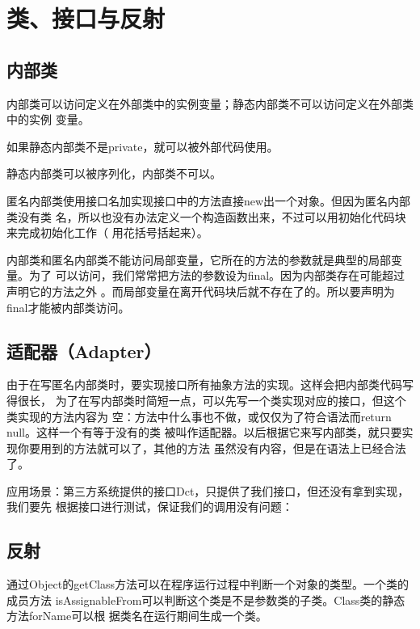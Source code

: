 \chapter{类、接口与反射}


\section{内部类}

内部类可以访问定义在外部类中的实例变量；静态内部类不可以访问定义在外部类中的实例
变量。

如果静态内部类不是private，就可以被外部代码使用。

静态内部类可以被序列化，内部类不可以。

匿名内部类使用接口名加实现接口中的方法直接new出一个对象。但因为匿名内部类没有类
名，所以也没有办法定义一个构造函数出来，不过可以用初始化代码块来完成初始化工作（
用花括号括起来）。

内部类和匿名内部类不能访问局部变量，它所在的方法的参数就是典型的局部变量。为了
可以访问，我们常常把方法的参数设为final。因为内部类存在可能超过声明它的方法之外
。而局部变量在离开代码块后就不存在了的。所以要声明为final才能被内部类访问。


\section{适配器（Adapter）}

由于在写匿名内部类时，要实现接口所有抽象方法的实现。这样会把内部类代码写得很长，
为了在写内部类时简短一点，可以先写一个类实现对应的接口，但这个类实现的方法内容为
空：方法中什么事也不做，或仅仅为了符合语法而return null。这样一个有等于没有的类
被叫作适配器。以后根据它来写内部类，就只要实现你要用到的方法就可以了，其他的方法
虽然没有内容，但是在语法上已经合法了。

应用场景：第三方系统提供的接口Dct，只提供了我们接口，但还没有拿到实现，我们要先
根据接口进行测试，保证我们的调用没有问题：









\section{反射}

通过Object的getClass方法可以在程序运行过程中判断一个对象的类型。一个类的成员方法
isAssignableFrom可以判断这个类是不是参数类的子类。Class类的静态方法forName可以根
据类名在运行期间生成一个类。

